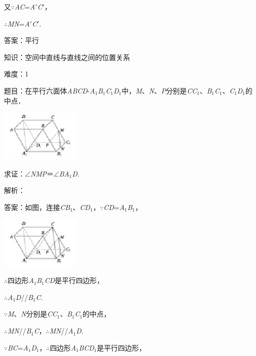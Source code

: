 \documentclass{article} %
\begin{document}
又$\mathrm{\because}$\textit{AC}=\textit{A}$'$\textit{C}$'$，

$\mathrm{\therefore}$\textit{MN}=\textit{A}$'$\textit{C}$'$.

答案：平行

知识：空间中直线与直线之间的位置关系

难度：1

题目：在平行六面体\textit{ABCD}-\textit{A}${}_{1}$\textit{B}${}_{1}$\textit{C}${}_{1}$\textit{D}${}_{1}$中，\textit{M}、\textit{N}、\textit{P}分别是\textit{CC}${}_{1}$、\textit{B}${}_{1}$\textit{C}${}_{1}$、\textit{C}${}_{1}$\textit{D}${}_{1}$的中点．

\includegraphics*[width=1.53in, height=0.98in, keepaspectratio=false]{image106}

求证：$\mathrm{\angle}$\textit{NMP}＝$\mathrm{\angle}$\textit{BA}${}_{1}$\textit{D}.

解析：

答案：如图，连接\textit{CB}${}_{1}$、\textit{CD}${}_{1}$，$\mathrm{\because}$\textit{CD}=\textit{A}${}_{1}$\textit{B}${}_{1}$，

\includegraphics*[width=1.53in, height=0.98in, keepaspectratio=false]{image107}

$\mathrm{\therefore}$四边形\textit{A}${}_{1}$\textit{B}${}_{1}$\textit{CD}是平行四边形，

$\mathrm{\therefore}$\textit{A}${}_{1}$\textit{D}//\textit{B}${}_{1}$\textit{C}.

$\mathrm{\because}$\textit{M}、\textit{N}分别是\textit{CC}${}_{1}$、\textit{B}${}_{1}$\textit{C}${}_{1}$的中点，

$\mathrm{\therefore}$\textit{MN}//\textit{B}${}_{1}$\textit{C}，$\mathrm{\therefore}$\textit{MN}//\textit{A}${}_{1}$\textit{D}.

$\mathrm{\because}$\textit{BC}=\textit{A}${}_{1}$\textit{D}${}_{1}$，$\mathrm{\therefore}$四边形\textit{A}${}_{1}$\textit{BCD}${}_{1}$是平行四边形，
\end{document}
